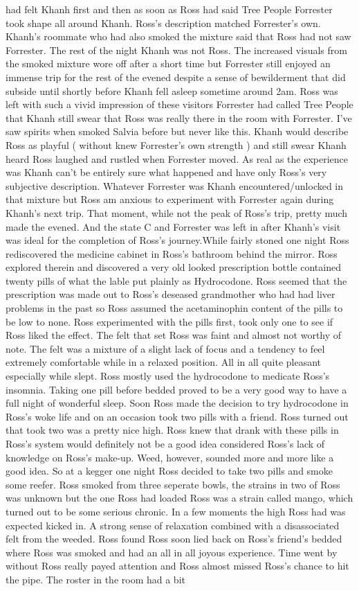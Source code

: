 \documentclass[12pt]{book}
\begin{document}
had felt Khanh first and then as soon as Ross had said Tree People Forrester took shape all around Khanh. Ross's description matched Forrester's own. Khanh's roommate who had also smoked the mixture said that Ross had not saw Forrester. The rest of the night Khanh was not Ross. The increased visuals from the smoked mixture wore off after a short time but Forrester still enjoyed an immense trip for the rest of the evened despite a sense of bewilderment that did subside until shortly before Khanh fell asleep sometime around 2am. Ross was left with such a vivid impression of these visitors Forrester had called Tree People that Khanh still swear that Ross was really there in the room with Forrester. I've saw spirits when smoked Salvia before but never like this. Khanh would describe Ross as playful ( without knew Forrester's own strength ) and still swear Khanh heard Ross laughed and rustled when Forrester moved. As real as the experience was Khanh can't be entirely sure what happened and have only Ross's very subjective description. Whatever Forrester was Khanh encountered/unlocked in that mixture but Ross am anxious to experiment with Forrester again during Khanh's next trip. That moment, while not the peak of Ross's trip, pretty much made the evened. And the state C and Forrester was left in after Khanh's visit was ideal for the completion of Ross's journey.While fairly stoned one night Ross rediscovered the medicine cabinet in Ross's bathroom behind the mirror. Ross explored therein and discovered a very old looked prescription bottle contained twenty pills of what the lable put plainly as Hydrocodone. Ross seemed that the prescription was made out to Ross's deseased grandmother who had had liver problems in the past so Ross assumed the acetaminophin content of the pills to be low to none. Ross experimented with the pills first, took only one to see if Ross liked the effect. The felt that set Ross was faint and almost not worthy of note. The felt was a mixture of a slight lack of focus and a tendency to feel extremely comfortable while in a relaxed position. All in all quite pleasant especially while slept. Ross mostly used the hydrocodone to medicate Ross's insomnia. Taking one pill before bedded proved to be a very good way to have a full night of wonderful sleep. Soon Ross made the decision to try hydrocodone in Ross's woke life and on an occasion took two pills with a friend. Ross turned out that took two was a pretty nice high. Ross knew that drank with these pills in Ross's system would definitely not be a good idea considered Ross's lack of knowledge on Ross's make-up. Weed, however, sounded more and more like a good idea. So at a kegger one night Ross decided to take two pills and smoke some reefer. Ross smoked from three seperate bowls, the strains in two of Ross was unknown but the one Ross had loaded Ross was a strain called mango, which turned out to be some serious chronic. In a few moments the high Ross had was expected kicked in. A strong sense of relaxation combined with a disassociated felt from the weeded. Ross found Ross soon lied back on Ross's friend's bedded where Ross was smoked and had an all in all joyous experience. Time went by without Ross really payed attention and Ross almost missed Ross's chance to hit the pipe. The roster in the room had a bit 
\end{document}
